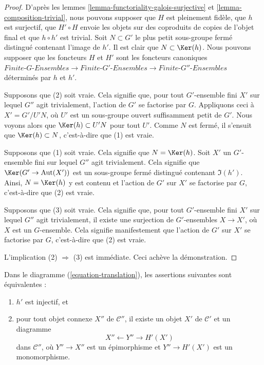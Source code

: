 \begin{proof}
D'après les lemmes \ref{lemma-functoriality-galois-surjective} et
\ref{lemma-composition-trivial}, nous pouvons supposer que
$H$ est pleinement fidèle, que $h$ est surjectif, que $H' \circ H$ envoie les
objets sur des coproduits de copies de l'objet final et que $h \circ h'$
est trivial. Soit $N \subset G'$ le plus petit sous-groupe fermé distingué
contenant l'image de $h'$. Il est clair que
$N \subset \Ker(h)$.
Nous pouvons supposer que les foncteurs $H$ et $H'$ sont les foncteurs canoniques
$\textit{Finite-}G\textit{-Ensembles} \to \textit{Finite-}G'\textit{-Ensembles}
\to \textit{Finite-}G''\textit{-Ensembles}$ déterminés par $h$ et $h'$.

\medskip\noindent
Supposons que (2) soit vraie. Cela signifie que, pour tout $G'$-ensemble fini $X'$
sur lequel $G''$ agit trivialement, l'action de $G'$ se factorise par $G$.
Appliquons ceci à $X' = G'/U'N$, où $U'$ est un sous-groupe ouvert suffisamment petit de $G'$.
Nous voyons alors que $\Ker(h) \subset U'N$ pour tout $U'$. Comme $N$ est fermé,
il s'ensuit que $\Ker(h) \subset N$, c'est-à-dire que (1) est vraie.

\medskip\noindent
Supposons que (1) soit vraie. Cela signifie que $N = \Ker(h)$. Soit $X'$ un
$G'$-ensemble fini sur lequel $G''$ agit trivialement. Cela signifie que
$\Ker(G' \to \text{Aut}(X'))$ est un sous-groupe fermé distingué contenant
$\Im(h')$. Ainsi, $N = \Ker(h)$ y est contenu et l'action de $G'$
sur $X'$ se factorise par $G$, c'est-à-dire que (2) est vraie.

\medskip\noindent
Supposons que (3) soit vraie. Cela signifie que, pour tout $G'$-ensemble fini $X'$
sur lequel $G''$ agit trivialement, il existe une surjection de $G'$-ensembles
$X \to X'$, où $X$ est un $G$-ensemble. Cela signifie manifestement que l'action de
$G'$ sur $X'$ se factorise par $G$, c'est-à-dire que (2) est vraie.

\medskip\noindent
L'implication (2) $\Rightarrow$ (3) est immédiate. Ceci achève la démonstration.
\end{proof}

\begin{lemma}
\label{lemma-functoriality-galois-injective}
Dans le diagramme (\ref{equation-translation}), les assertions suivantes sont équivalentes :
\begin{enumerate}
\item $h'$ est injectif, et
\item pour tout objet connexe $X''$ de $\mathcal{C}''$,
il existe un objet $X'$ de $\mathcal{C}'$ et un diagramme
$$
X'' \leftarrow Y'' \rightarrow H'(X')
$$
dans $\mathcal{C}''$, où $Y'' \to X''$ est un épimorphisme et
$Y'' \to H'(X')$ est un monomorphisme.
\end{enumerate}
\end{lemma}


